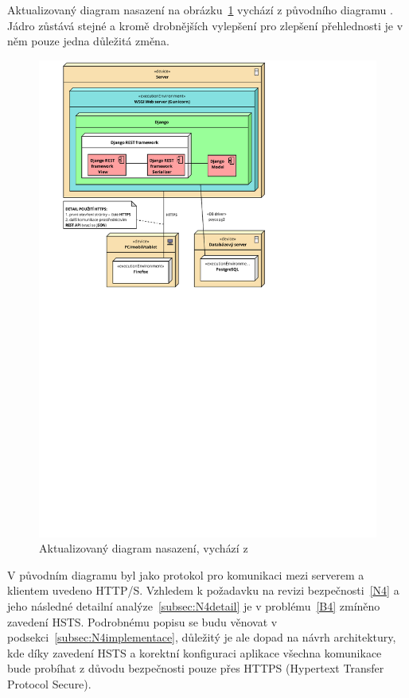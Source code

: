 Aktualizovaný diagram nasazení na obrázku~\ref{fig:deployment-diagram} vychází z původního diagramu \cite{bp}. Jádro zůstává stejné a kromě drobnějších vylepšení pro zlepšení přehlednosti je v něm pouze jedna důležitá změna.
    
\begin{figure}[h]\centering
	\includegraphics[width=1\textwidth]{img/deployment-diagram}
	\caption[Aktualizovaný diagram nasazení]{Aktualizovaný diagram nasazení, vychází z~\cite{bp}}\label{fig:deployment-diagram}
\end{figure}

V původním diagramu byl jako protokol pro komunikaci mezi serverem a klientem uvedeno HTTP/S. Vzhledem k požadavku na revizi bezpečnosti~\ref{N4} a jeho následné detailní analýze~\ref{subsec:N4detail} je v problému~\ref{B4} zmíněno zavedení HSTS. Podrobnému popisu se budu věnovat v podsekci~\ref{subsec:N4implementace}, důležitý je ale dopad na návrh architektury, kde díky zavedení HSTS a korektní konfiguraci aplikace všechna komunikace bude probíhat z důvodu bezpečnosti pouze přes HTTPS (Hypertext Transfer Protocol Secure).

